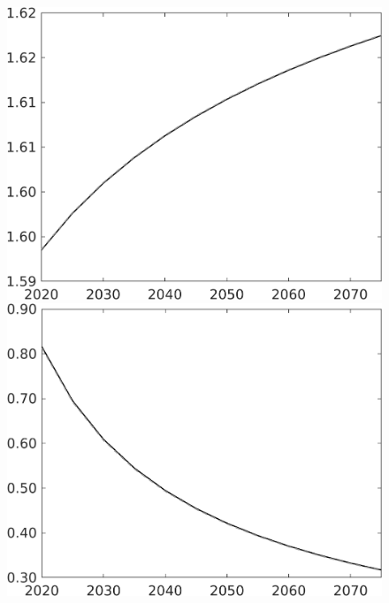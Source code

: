 \documentclass[12pt]{article}
\begin{document}
\begin{figure}[h!!]
\begin{minipage}[]{0.32\textwidth}
	\end{minipage}	
	\begin{minipage}[]{0.32\textwidth}
		\includegraphics[width=1\textwidth]{../../codding_model/own_basedOnFried/optimalPol_010922_revision/figures/all_13Sept22/CompTaul_Equlab_LFBAU_Reg0_pn_spillover0_nsk0_xgr1_knspil0_sep1_countec0_GovRev0_etaa0.79_lgd0.png}
	\end{minipage}	
	\begin{minipage}[]{0.32\textwidth}
		\includegraphics[width=1\textwidth]{../../codding_model/own_basedOnFried/optimalPol_010922_revision/figures/all_13Sept22/CompTaul_Equlab_LFBAU_Reg0_pg_spillover0_nsk0_xgr1_knspil0_sep1_countec0_GovRev0_etaa0.79_lgd0.png}

\end{minipage}
\end{figure}
\end{document}
